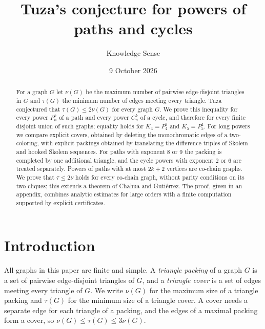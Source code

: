 \documentclass{amsart}
\theoremstyle{definition}
\theoremstyle{remark}
\numberwithin{equation}{section}
\numberwithin{table}{section}
\begin{document}
\title[Tuza's conjecture for powers of paths and cycles]{Tuza's conjecture for powers of paths and cycles}
\author{Knowledge Sense}
\address{Knowledge Sense}
\date{9 October 2026}

\begin{abstract}
For a graph $G$ let $\nu(G)$ be the maximum number of pairwise edge-disjoint triangles in $G$ and $\tau(G)$ the minimum number of edges meeting every triangle. Tuza conjectured that $\tau(G)\le 2\nu(G)$ for every graph $G$. We prove this inequality for every power $P_n^k$ of a path and every power $C_n^k$ of a cycle, and therefore for every finite disjoint union of such graphs; equality holds for $K_4=P_4^3$ and $K_5=P_5^4$. For long powers we compare explicit covers, obtained by deleting the monochromatic edges of a two-coloring, with explicit packings obtained by translating the difference triples of Skolem and hooked Skolem sequences. For paths with exponent $8$ or $9$ the packing is completed by one additional triangle, and the cycle powers with exponent $2$ or $6$ are treated separately. Powers of paths with at most $2k+2$ vertices are co-chain graphs. We prove that $\tau\le2\nu$ holds for every co-chain graph, without parity conditions on its two cliques; this extends a theorem of Chahua and Guti\'errez. The proof, given in an appendix, combines analytic estimates for large orders with a finite computation supported by explicit certificates.
\end{abstract}

\maketitle

\section{Introduction}

All graphs in this paper are finite and simple. A \emph{triangle packing} of a graph $G$ is a set of pairwise edge-disjoint triangles of $G$, and a \emph{triangle cover} is a set of edges meeting every triangle of $G$. We write $\nu(G)$ for the maximum size of a triangle packing and $\tau(G)$ for the minimum size of a triangle cover. A cover needs a separate edge for each triangle of a packing, and the edges of a maximal packing form a cover, so $\nu(G)\le\tau(G)\le3\nu(G)$.
\end{document}
